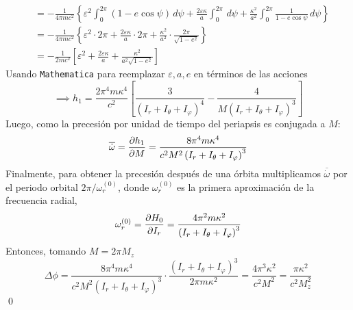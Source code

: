 \documentclass[]{article}
\numberwithin{equation}{section}
\begin{document}
\begin{enumerate}
\begin{align}
		&= -\frac{1}{4\pi mc^2} \left\{\varepsilon^2 \int_0^{2\pi} (1-e\cos\psi) \, d\psi + \frac{2\varepsilon\kappa}{a} \int_0^{2\pi} \, d\psi + \frac{\kappa^2}{a^2} \int_0^{2\pi} \frac{1}{1 - e\cos\psi} \, d\psi \right\}\nonumber\\
		&= -\frac{1}{4\pi mc^2} \left\{\varepsilon^2 \cdot 2\pi + \frac{2\varepsilon\kappa}{a} \cdot 2\pi + \frac{\kappa^2}{a^2} \cdot \frac{2\pi}{\sqrt{1-e^2}} \right\}\nonumber\\
		&= -\frac{1}{2mc^2}\left[\varepsilon^2 + \frac{2\varepsilon\kappa}{a} + \frac{\kappa^2}{a^2 \sqrt{1-e^2}}\right]
	\end{align}
	Usando \texttt{Mathematica} para reemplazar $\varepsilon, a, e$ en términos de las acciones
	\begin{equation}
		\implies h_1 = \frac{2 \pi^4 m \kappa^4}{c^2} \left[\frac{3}{\left(I_r + I_\theta + I_\varphi\right)^4} - \frac{4}{M \left(I_r + I_\theta + I_\varphi\right)^3}\right]
	\end{equation}
	Luego, como la precesión por unidad de tiempo del periapsis es conjugada a $M$:
	\begin{equation}
		\overline{\dot{\omega}} = \dfrac{\partial h_1}{\partial M} = \frac{8 \pi^4 m \kappa^4}{c^2 M^2 \left(I_r + I_\theta + I_\varphi\right)^3}
	\end{equation}
	Finalmente, para obtener la precesión después de una órbita multiplicamos $\overline{\dot{\omega}}$ por el periodo orbital $2\pi/\omega_r^{(0)}$, donde $\omega_r^{(0)}$ es la primera aproximación de la frecuencia radial,
	\begin{equation}
		\omega_r^{(0)} = \dfrac{\partial H_0}{\partial I_r} = \frac{4\pi^2 m\kappa^2}{\left(I_r + I_\theta + I_\varphi\right)^3}
	\end{equation}
	Entonces, tomando $M = 2\pi M_z$
	\begin{equation}
		\Delta \phi = \frac{8 \pi^4 m \kappa^4}{c^2 M^2 \left(I_r + I_\theta + I_\varphi\right)^3} \cdot \frac{\left(I_r + I_\theta + I_\varphi\right)^3}{2\pi m\kappa^2} = \frac{4\pi^3\kappa^2}{c^2 M^2} = \frac{\pi\kappa^2}{c^2 M_z^2}
	\end{equation}
	\qed
	

\end{enumerate}
\end{document}
